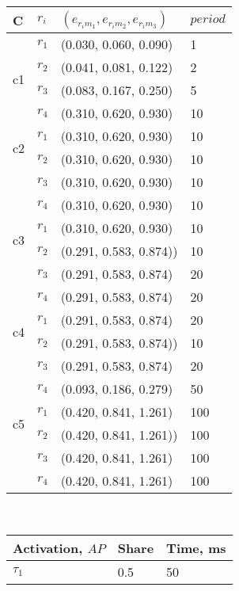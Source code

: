 \begin{center}
\small
\begin{minipage}{.5\textwidth}%
\centering
\begin{tabular}{@{}p{0.25cm}lll@{}}
\toprule
C& $r_i$ & $(e_{r_im_1}, e_{r_im_2}, e_{r_im_3})$ & $period$\\ \midrule
\multirow{4}{4em}{c1} 
&$r_1$ & (0.030, 0.060, 0.090) & 1\\
&$r_2$ & (0.041, 0.081, 0.122) & 2\\
&$r_3$ & (0.083, 0.167, 0.250)  & 5\\ 
&$r_4$ & (0.310, 0.620, 0.930) & 10 \\[0.3em]
\multirow{2}{4em}{c2} 
&$r_1$ & (0.310, 0.620, 0.930) & 10\\
&$r_2$ & (0.310, 0.620, 0.930) & 10\\
&$r_3$ & (0.310, 0.620, 0.930)  & 10\\ 
&$r_4$ & (0.310, 0.620, 0.930) & 10 \\[0.3em]
\multirow{2}{4em}{c3} 
&$r_1$ & (0.310, 0.620, 0.930) & 10\\
&$r_2$ & (0.291, 0.583, 0.874)) & 10\\
&$r_3$ & (0.291, 0.583, 0.874)  & 20\\ 
&$r_4$ & (0.291, 0.583, 0.874) & 20 \\[0.3em]
\multirow{2}{4em}{c4} 
&$r_1$ & (0.291, 0.583, 0.874) & 20\\
&$r_2$ & (0.291, 0.583, 0.874)) & 10\\
&$r_3$ & (0.291, 0.583, 0.874)  & 20\\ 
&$r_4$ & (0.093, 0.186, 0.279) & 50 \\[0.3em]
\multirow{2}{4em}{c5} 
&$r_1$ & (0.420, 0.841, 1.261) & 100\\
&$r_2$ & (0.420, 0.841, 1.261)) & 100\\
&$r_3$ & (0.420, 0.841, 1.261)  & 100\\ 
&$r_4$ & (0.420, 0.841, 1.261) & 100 \\[0.3em]
\bottomrule
\end{tabular}
\label{tbl_comps_config}
\end{minipage}~
\begin{minipage}{.45\textwidth}
\begin{center}
    \begin{tabular}{@{}lll@{}}
    \toprule
    Activation, $AP$ & Share & Time, ms \\ \midrule
    $\tau_1$ & 0.5  & 50\\

\end{tabular}
\end{center}
\end{minipage}
\end{center}
